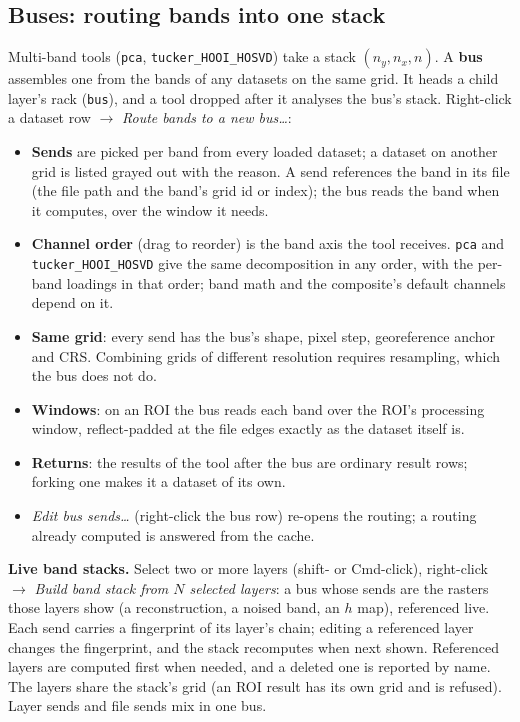\documentclass[10pt]{article}
\newcommand{\dev}[1]{\texttt{#1}}
\begin{document}
\subsection*{Buses: routing bands into one stack}\label{sec:buses}
Multi-band tools (\dev{pca}, \dev{tucker\_HOOI\_HOSVD}) take a stack $(n_y,n_x,n)$. A
\textbf{bus} assembles one from the bands of any datasets on the same grid. It heads a child
layer's rack (\dev{bus}), and a tool dropped after it analyses the bus's stack. Right-click a
dataset row $\to$ \emph{Route bands to a new bus\ldots}:
\begin{itemize}\itemsep2pt
  \item \textbf{Sends} are picked per band from every loaded dataset; a dataset on another
        grid is listed grayed out with the reason. A send references the band in its file
        (the file path and the band's grid id or index); the bus reads the band when it
        computes, over the window it needs.
  \item \textbf{Channel order} (drag to reorder) is the band axis the tool receives.
        \dev{pca} and \dev{tucker\_HOOI\_HOSVD} give the same decomposition in any order, with
        the per-band loadings in that order; band math and the composite's default channels
        depend on it.
  \item \textbf{Same grid}: every send has the bus's shape, pixel step, georeference anchor and
        CRS. Combining grids of different resolution requires resampling, which the bus does
        not do.
  \item \textbf{Windows}: on an ROI the bus reads each band over the ROI's processing window,
        reflect-padded at the file edges exactly as the dataset itself is.
  \item \textbf{Returns}: the results of the tool after the bus are ordinary result rows;
        forking one makes it a dataset of its own.
  \item \emph{Edit bus sends\ldots} (right-click the bus row) re-opens the routing; a routing
        already computed is answered from the cache.
\end{itemize}

\textbf{Live band stacks.} Select two or more layers (shift- or Cmd-click), right-click
$\to$ \emph{Build band stack from $N$ selected layers}: a bus whose sends are the rasters those
layers show (a reconstruction, a noised band, an $h$ map), referenced live. Each send carries
a fingerprint of its layer's chain; editing a referenced layer changes the fingerprint, and
the stack recomputes when next shown. Referenced layers are computed first when needed, and a
deleted one is reported by name. The layers share the stack's grid (an ROI result has its own
grid and is refused). Layer sends and file sends mix in one bus.
\end{document}
